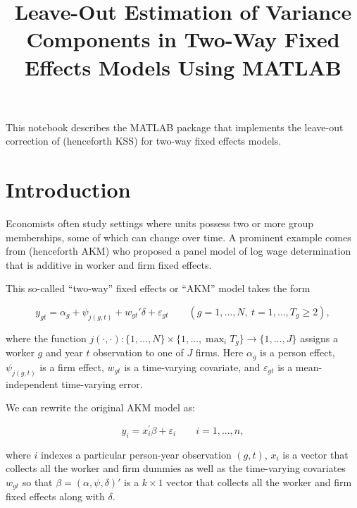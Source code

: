 \documentclass[11pt]{article}
\title{Leave-Out Estimation of Variance Components in Two-Way Fixed Effects Models Using MATLAB}
\begin{document}
    
        \maketitle
    
    

    
    This notebook describes the MATLAB package that implements the leave-out
correction of \cite*{kline2020leave} (henceforth KSS)  for
two-way fixed effects models.

    \tableofcontents
    \newpage

    \hypertarget{introduction}{%
\section{Introduction}\label{introduction}}

Economists often study settings where units possess two or more group
memberships, some of which can change over time. A prominent example
comes from \cite{abowd1999high} (henceforth AKM) who
proposed a panel model of log wage determination that is additive in
worker and firm fixed effects.

This so-called ``two-way'' fixed effects or ``AKM'' model takes the
form

\begin{equation}
    y_{gt} =  \alpha_{{g}} + \psi_{j({g},t)} + w_{gt}'\delta +  \varepsilon_{gt}  \qquad({g}=1,\dots,N, \ t=1,\dots,T_{g} \ge 2),
\end{equation}

where the function
\(j(\cdot ,\cdot ):\lbrace 1,\dots ,N\rbrace \times \lbrace 1,\dots ,\max_i T_g \rbrace \to \lbrace 1,\dots ,J\rbrace\)
assigns a worker \(g\) and year \(t\) observation to one of \(J\) firms.
Here \(\alpha_g\) is a person effect, \(\psi_{j(g,t)}\) is a firm
effect, \(w_{gt}\) is a time-varying covariate, and \(\varepsilon_{gt}\)
is a mean-independent time-varying error.

We can rewrite the original AKM model as:

\begin{equation}
y_i =x_i^{\prime } \beta +\varepsilon_i \qquad i=1,...,n,
\end{equation}

where \(i\) indexes a particular person-year observation \((g,t)\),
\(x_i\) is a vector that collects all the worker and firm dummies as well
as the time-varying covariates \(w_{gt}\) so that
\(\beta =(\alpha ,\psi ,\delta )'\) is a \(k\times 1\) vector that
collects all the worker and firm fixed effects along with \(\delta\).
\end{document}
